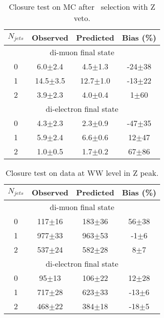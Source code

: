 \begin{table}[!ht]
\begin{center}
\begin{tabular} {|c|ccc|}
\hline
$N_{jets}$  & Observed & Predicted & Bias (\%) \\
\hline 
\hline
\multicolumn{4}{|c|}{di-muon final state} \\
\hline
0 &  6.0$\pm$2.4 &  4.5$\pm$1.3 & -24$\pm$38 \\
1 & 14.5$\pm$3.5 & 12.7$\pm$1.0 & -13$\pm$22 \\
2 &  3.9$\pm$2.3 &  4.0$\pm$0.4 &   1$\pm$60 \\
\hline 
\hline
\multicolumn{4}{|c|}{di-electron final state} \\
\hline
0 & 4.3$\pm$2.3 & 2.3$\pm$0.9 & -47$\pm$35 \\
1 & 5.9$\pm$2.4 & 6.6$\pm$0.6 &  12$\pm$47 \\
2 & 1.0$\pm$0.5 & 1.7$\pm$0.2 &  67$\pm$86 \\
\hline 
\end{tabular}
\caption{Closure test on MC after  \GeVcc\ selection with Z veto.}
\label{tab:mc_closure_120_zv}
\end{center}
\end{table}

\begin{table}[!ht]
\begin{center}
\begin{tabular} {|c|ccc|}
\hline
$N_{jets}$  & Observed & Predicted & Bias (\%) \\
\hline 
\hline
\multicolumn{4}{|c|}{di-muon final state} \\
\hline
0 & 117$\pm$16 & 183$\pm$36 & 56$\pm$38 \\
1 & 977$\pm$33 & 963$\pm$53 & -1$\pm$6  \\
2 & 537$\pm$24 & 582$\pm$28 &  8$\pm$7 \\
\hline 
\hline
\multicolumn{4}{|c|}{di-electron final state} \\
\hline
0 &  95$\pm$13 & 106$\pm$22 &  12$\pm$28 \\
1 & 717$\pm$28 & 623$\pm$33 & -13$\pm$6  \\
2 & 468$\pm$22 & 384$\pm$18 & -18$\pm$5  \\
\hline 
\end{tabular}
\caption{Closure test on data at WW level in Z peak.}
\label{tab:data_closure_ww_zp}
\end{center}
\end{table}


